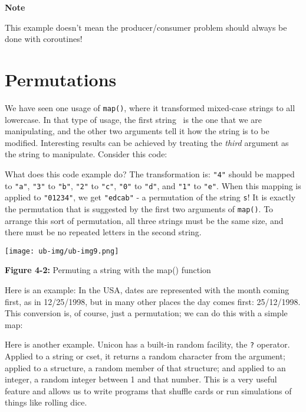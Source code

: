 {\sffamily\bfseries
Note}

{\sffamily
This example doesn't mean the producer/consumer problem
should always be done with coroutines!}

\section{Permutations}

We have seen one usage of
\texttt{map()}, where it transformed mixed-case strings to
all lowercase. In that type of usage, the first string \ is the one
that we are manipulating, and the other two arguments tell it how the
string is to be modified. Interesting results can be achieved by
treating the \textit{third} argument as the string to manipulate.
Consider this code:


What does this code example do? The transformation is:
\texttt{"4"} should be mapped to
\texttt{"a"},
\texttt{"3"} to
\texttt{"b"},
\texttt{"2"} to
\texttt{"c"},
\texttt{"0"} to
\texttt{"d"}, and
\texttt{"1"} to
\texttt{"e"}. When this mapping is applied
to \texttt{"01234"}, we get
\texttt{"edcab"} - a permutation of the
string \texttt{s}! It is exactly the permutation that is suggested by
the first two arguments of \texttt{map()}. To arrange this sort of
permutation, all three strings must be the same size, and there must be
no repeated letters in the second string.


\begin{center}
\texttt{[image: ub-img/ub-img9.png]}
\end{center}
{\sffamily\bfseries Figure 4-2:}
{\sffamily Permuting a string with the map() function}

\bigskip

Here is an example: In the USA, dates are represented with the month
coming first, as in 12/25/1998, but in many other places the day comes
first: 25/12/1998. This conversion is, of course, just a permutation;
we can do this with a simple map:


Here is another example. Unicon has a built-in random facility, the
\texttt{?} operator. Applied to a string or cset, it returns a random
character from the argument; applied to a structure, a random member of
that structure; and applied to an integer, a random integer between 1
and that number. This is a very useful feature and allows us to write
programs that shuffle cards or run simulations of things like rolling
dice.

